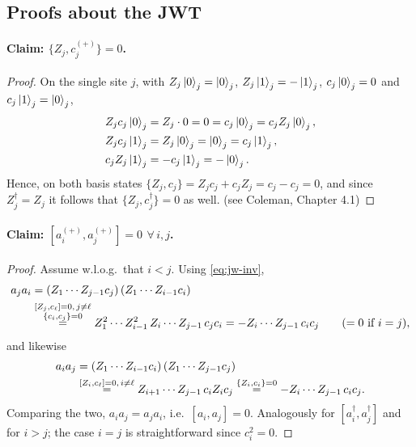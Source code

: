 \documentclass[../../main.tex]{subfiles}
\begin{document}
\subsection{Proofs about the JWT} \label{subsec:proofs_jwt}

\paragraph{Claim: $\{Z_j,c_j^{(+)}\}=0$.}
\begin{proof}
On the single site $j$, with $Z_j\left\lvert 0 \right\rangle_j=\left\lvert 0 \right\rangle_j$, $Z_j\left\lvert 1 \right\rangle_j=-\left\lvert 1 \right\rangle_j$,
$c_j\left\lvert 0 \right\rangle_j=0$ and $c_j\left\lvert 1 \right\rangle_j=\left\lvert 0 \right\rangle_j$,
\begin{align}
Z_j c_j\left\lvert 0 \right\rangle_j&=Z_j\cdot 0=0=c_j\left\lvert 0 \right\rangle_j=c_j Z_j\left\lvert 0 \right\rangle_j,\\
Z_j c_j\left\lvert 1 \right\rangle_j&=Z_j\left\lvert 0 \right\rangle_j=\left\lvert 0 \right\rangle_j=c_j\left\lvert 1 \right\rangle_j,\\
c_j Z_j\left\lvert 1 \right\rangle_j&=-c_j\left\lvert 1 \right\rangle_j=-\left\lvert 0 \right\rangle_j.
\end{align}
Hence, on both basis states $\{Z_j,c_j\}=Z_j c_j+c_j Z_j=c_j-c_j=0$, and since
$Z_j^\dagger=Z_j$ it follows that $\{Z_j,c_j^\dagger\}=0$ as well. (see Coleman, Chapter 4.1)
\end{proof}

\paragraph{Claim: $[a_i^{(+)},a_j^{(+)}]=0\ \, \forall\,i,j$.}
\begin{proof}
Assume w.l.o.g.\ that $i<j$. Using \cref{eq:jw-inv},
\begin{align}
a_j a_i&=\left(Z_1\cdots Z_{j-1}c_j\right)\left(Z_1\cdots Z_{i-1}c_i\right)\notag\\
&\overset{\substack{[Z_j,c_\ell]=0,\,j\neq\ell\\ \{c_i,c_j\}=0}}{=}
Z_1^2\cdots Z_{i-1}^2\,Z_i\cdots Z_{j-1}\,c_j c_i
=-Z_i\cdots Z_{j-1}\,c_i c_j\qquad(=0\text{ if }i=j),
\end{align}
and likewise
\begin{align}
a_i a_j&=\left(Z_1\cdots Z_{i-1}c_i\right)\left(Z_1\cdots Z_{j-1}c_j\right)\notag\\
&\overset{[Z_i,c_\ell]=0,\,i\neq\ell}{=}Z_{i+1}\cdots Z_{j-1}\,c_i Z_i c_j
\overset{\{Z_i,c_i\}=0}{=}-Z_i\cdots Z_{j-1}\,c_i c_j.
\end{align}
Comparing the two, $a_i a_j=a_j a_i$, i.e.\ $[a_i,a_j]=0$. Analogously for
$[a_i^\dagger,a_j^\dagger]$ and for $i>j$; the case $i=j$ is straightforward since
$c_i^2=0$.
\end{proof}
\end{document}
